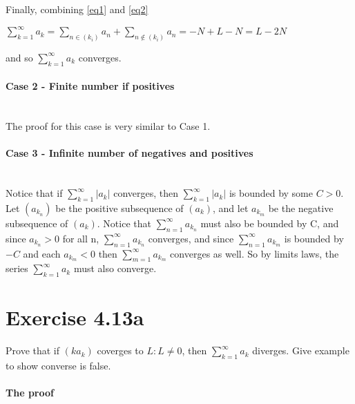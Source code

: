 \documentclass[11pt]{article}
\begin{document}
Finally, combining \eqref{eq1} and \eqref{eq2}

$\sum\limits_{k=1}^{\infty}a_k = \sum\limits_{n \in (k_i)} a_n + \sum\limits_{n \notin (k_i)} a_{n} = -N + L - N = L - 2N$


and so $\sum\limits_{k=1}^{\infty}a_k$ converges.

\paragraph{Case 2 - Finite number if positives} ~\\

The proof for this case is very similar to Case 1.

\paragraph{Case 3 - Infinite number of negatives and positives} ~\\

Notice that if $\sum\limits_{k=1}^{\infty}|a_k|$ converges, then $\sum\limits_{k=1}^{\infty}|a_k|$ is bounded by some $C>0$. Let $(a_{k_n})$ be the positive subsequence of $(a_k)$, and let $a_{k_m}$ be the negative subsequence of $(a_k)$. Notice that $\sum\limits_{n=1}^{\infty}a_{k_n}$ must also be bounded by C, and since $a_{k_n}>0$ for all n, $\sum\limits_{n=1}^{\infty}a_{k_n}$ converges, and since $\sum\limits_{n=1}^{\infty}a_{k_m}$ is bounded by $-C$ and each $a_{k_m}<0$ then $\sum\limits_{m=1}^{\infty}a_{k_m}$ converges as well. So by limits laws, the series $\sum\limits_{k=1}^{\infty}a_k$ must also converge.


\section*{Exercise 4.13a} 

Prove that if $(ka_k)$ coverges to $L:L\neq0$, then $\sum\limits_{k=1}^{\infty}a_k$ diverges. Give example to show converse is false.

\bigskip

\paragraph{The proof}~\\
\end{document}
